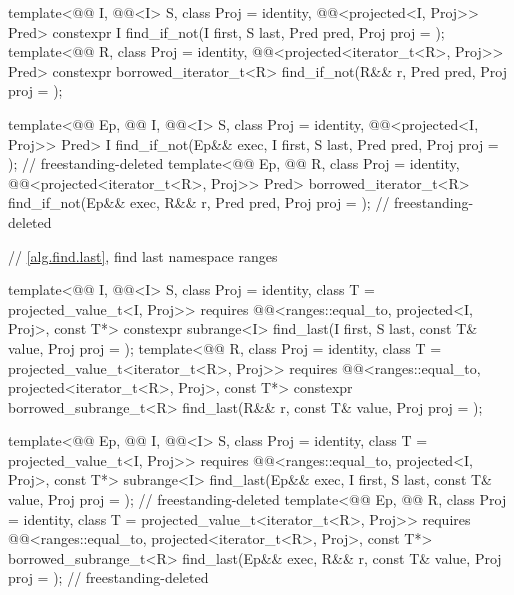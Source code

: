 \begin{codeblock}
{{    template<@@ I, @@<I> S, class Proj = identity,
             @@<projected<I, Proj>> Pred>
      constexpr I find_if_not(I first, S last, Pred pred, Proj proj = {});
    template<@@ R, class Proj = identity,
             @@<projected<iterator_t<R>, Proj>> Pred>
      constexpr borrowed_iterator_t<R>
        find_if_not(R&& r, Pred pred, Proj proj = {});

    template<@@ Ep, @@ I, @@<I> S,
             class Proj = identity, @@<projected<I, Proj>> Pred>
      I find_if_not(Ep&& exec, I first, S last, Pred pred, Proj proj = {}); // freestanding-deleted
    template<@@ Ep, @@ R, class Proj = identity,
             @@<projected<iterator_t<R>, Proj>> Pred>
      borrowed_iterator_t<R>
        find_if_not(Ep&& exec, R&& r, Pred pred, Proj proj = {});           // freestanding-deleted
  }

  // \ref{alg.find.last}, find last
  namespace ranges {
    template<@@ I, @@<I> S, class Proj = identity,
             class T = projected_value_t<I, Proj>>
      requires @@<ranges::equal_to, projected<I, Proj>, const T*>
      constexpr subrange<I> find_last(I first, S last, const T& value, Proj proj = {});
    template<@@ R, class Proj = identity,
             class T = projected_value_t<iterator_t<R>, Proj>>
      requires
        @@<ranges::equal_to, projected<iterator_t<R>, Proj>, const T*>
      constexpr borrowed_subrange_t<R> find_last(R&& r, const T& value, Proj proj = {});

    template<@@ Ep, @@ I, @@<I> S,
             class Proj = identity, class T = projected_value_t<I, Proj>>
      requires @@<ranges::equal_to, projected<I, Proj>, const T*>
      subrange<I>
        find_last(Ep&& exec, I first, S last, const T& value,
                  Proj proj = {});                                          // freestanding-deleted
    template<@@ Ep, @@ R, class Proj = identity,
             class T = projected_value_t<iterator_t<R>, Proj>>
      requires
        @@<ranges::equal_to, projected<iterator_t<R>, Proj>, const T*>
      borrowed_subrange_t<R>
        find_last(Ep&& exec, R&& r, const T& value, Proj proj = {});        // freestanding-deleted

}}
\end{codeblock}
